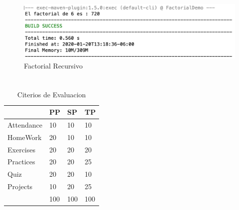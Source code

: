 \documentclass[10pt,a4paper]{article}
\begin{document}
\subsubsection{\textit{ \color{colorESCOM}{Factorial Resursivo }}}
\lipsum[2-3]

\begin{figure}[H]
	\includegraphics[scale=.54]{factorialRecursivo.png}
	\centering \linebreak \linebreak 
	\caption{Factorial Recursivo}
	\label{img:factorialRecursivo}
\end{figure}  \hfill


\pagebreak


\section{\color{colorIPN}{Conclusión}}
\lipsum[2-3]

\begin{table}[htb]
	\centering
	\begin{tabular}{p{2cm} |p{2cm} |p{2cm} |p{3cm}}\hline \hline
		&PP    	& SP   & TP \\ \hline \hline
		Attendance           &  10    & 10 & 10\\ \hline 
		HomeWork           &  20    & 10 & 10\\ \hline 
		Exercises              &  20    & 20 & 20\\ \hline 
		Practices               &  20    & 20 & 25\\ \hline 
		Quiz                      &  20    & 20 & 10\\ \hline 
		Projects                &  10    & 20 & 25  \\ \hline 
		&  100    & 100 & 100\\ \cline{1-2}
		
		\hline \hline
	\end{tabular}
			\caption{Citerios de Evaluacion}
	\label{tabla:Criterios}
\end{table}

\end{document}
